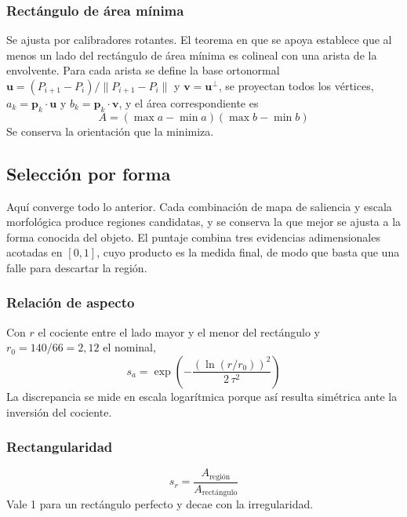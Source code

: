 \documentclass[conference]{IEEEtran}
\begin{document}
\subsubsection{Rectángulo de área mínima}
Se ajusta por calibradores rotantes. El teorema en que se apoya
establece que al menos un lado del rectángulo de área mínima es
colineal con una arista de la envolvente. Para cada arista se define la
base ortonormal $\mathbf{u} = (P_{i+1}-P_i)/\lVert P_{i+1}-P_i\rVert$ y
$\mathbf{v} = \mathbf{u}^{\perp}$, se proyectan todos los vértices,
$a_k = \mathbf{p}_k\!\cdot\!\mathbf{u}$ y
$b_k = \mathbf{p}_k\!\cdot\!\mathbf{v}$, y el área correspondiente es
\begin{equation}
A = (\max a - \min a)(\max b - \min b)
\end{equation}
Se conserva la orientación que la minimiza.

\subsection{Selección por forma}
\label{sec:seleccion}

Aquí converge todo lo anterior. Cada combinación de mapa de saliencia y
escala morfológica produce regiones candidatas, y se conserva la que
mejor se ajusta a la forma conocida del objeto. El puntaje combina tres
evidencias adimensionales acotadas en $[0,1]$, cuyo producto es la
medida final, de modo que basta que una falle para descartar la región.

\subsubsection{Relación de aspecto}
Con $r$ el cociente entre el lado mayor y el menor del rectángulo y
$r_0 = 140/66 = 2{,}12$ el nominal,
\begin{equation}
s_a = \exp\!\left(-\frac{\left(\ln(r/r_0)\right)^2}{2\,\tau^2}\right)
\end{equation}
La discrepancia se mide en escala logarítmica porque así resulta
simétrica ante la inversión del cociente.

\subsubsection{Rectangularidad}
\begin{equation}
s_r = \frac{A_{\text{región}}}{A_{\text{rectángulo}}}
\end{equation}
Vale 1 para un rectángulo perfecto y decae con la irregularidad.
\end{document}
